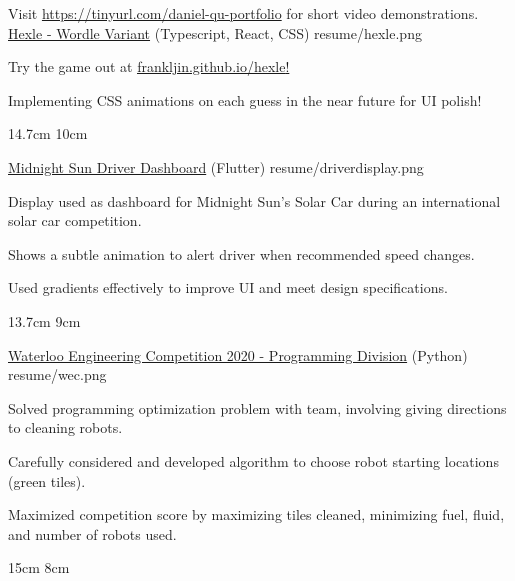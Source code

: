 

\begin{cventries}

  Visit \href{https://docs.google.com/document/d/e/2PACX-1vS0EqgEdK7blzAP3eqhoXZXuYXNIMIreo-fD56--8hDs616NmmvpaythZmCKw7Pt4CDEAfRSdoIxmMB/pub}{https://tinyurl.com/daniel-qu-portfolio} for short video demonstrations.
  \\%
  \portfolioEntry
    {\href{https://frankljin.github.io/hexle/}{Hexle - Wordle Variant} (Typescript, React, CSS)} %
    {resume/hexle.png} %
    {
      \begin{cvitems} %
        \item {Try the game out at \href{https://frankljin.github.io/hexle/}{\underline{frankljin.github.io/hexle}!}}
        \item {Implementing CSS animations on each guess in the near future for UI polish!}
      \end{cvitems}
    }
    {14.7cm}
    {10cm}

  \portfolioEntry
    {\href{https://github.com/uw-midsun/telemetry_xiv}{Midnight Sun Driver Dashboard} (Flutter)} %
    {resume/driverdisplay.png} %
    {
      \begin{cvitems} %
        \item {Display used as dashboard for Midnight Sun's Solar Car during an international solar car competition.}
        \item {Shows a subtle animation to alert driver when recommended speed changes.}
        \item {Used gradients effectively to improve UI and meet design specifications.}
      \end{cvitems}
    }
    {13.7cm}
    {9cm}

  \newpage

  \portfolioEntry
    {\href{https://github.com/danielq987/WECF2020}{Waterloo Engineering Competition 2020 - Programming Division} (Python)} %
    {resume/wec.png} %
    {
      \begin{cvitems} %
        \item {Solved programming optimization problem with team, involving giving directions to cleaning robots.}
        \item {Carefully considered and developed algorithm to choose robot starting locations (green tiles).}
        \item {Maximized competition score by maximizing tiles cleaned, minimizing fuel, fluid, and number of robots used.}
      \end{cvitems}
    }
    {15cm}
    {8cm}
  


\end{cventries}
